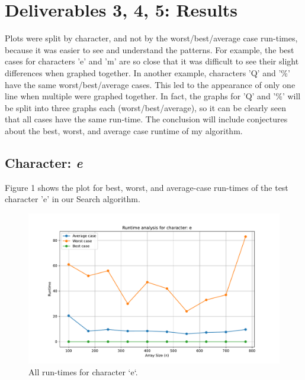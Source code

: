 \documentclass{article}
\begin{document}
\section{Deliverables 3, 4, 5: Results}
Plots were split by character, and not by the worst/best/average case run-times, because it was easier to see and understand the patterns. For example, the best cases for characters 'e' and 'm' are so close that it was difficult to see their slight differences when graphed together. In another example, characters 'Q' and '\%' have the same worst/best/average cases. This led to the appearance of only one line when multiple were graphed together. In fact, the graphs for 'Q' and '\%' will be split into three graphs each (worst/best/average), so it can be clearly seen that all cases have the same run-time. The conclusion will include conjectures about the best, worst, and average case runtime of my algorithm.
	
\subsection{Character: \textit{e}}
Figure 1 shows the plot for best, worst, and average-case run-times of the test character 'e' in our Search algorithm.
    \begin{figure}[H]
	\centering
	\includegraphics[width=\textwidth]{runtime_analysis_e.pdf}
	\caption{All run-times for character `e`.}
    \end{figure}
\end{document}
